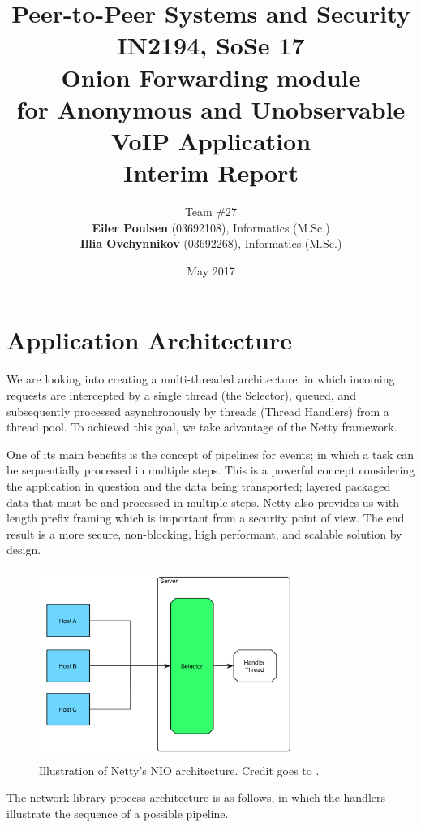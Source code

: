 \documentclass{article}
\title{Peer-to-Peer Systems and Security \\
        \large{IN2194, SoSe 17} \\
        \huge{Onion Forwarding module} \\
        \small{for Anonymous and Unobservable VoIP Application} \\
        \bigbreak
        \large{\textbf{Interim Report}}}
\author{Team \#27 \\
\textbf{Eiler Poulsen} (03692108), Informatics (M.Sc.) \\
\textbf{Illia Ovchynnikov} (03692268), Informatics (M.Sc.)}
\date{May 2017}
\begin{document}
\maketitle

\section{Application Architecture}
We are looking into creating a multi-threaded architecture, in which incoming requests are intercepted by a single thread (the Selector), queued, and subsequently processed asynchronously by threads (Thread Handlers) from a thread pool. To achieved this goal, we take advantage of the Netty framework\cite{netty}.

One of its main benefits is the concept of pipelines for events; in which a task can be sequentially processed in multiple steps. This is a powerful concept considering the application in question and the data being transported; layered packaged data that must be and processed in multiple steps. Netty also provides us with length prefix framing which is important from a security point of view. The end result is a more secure, non-blocking, high performant, and scalable solution by design.

\begin{figure}[H]
\centering
     \includegraphics[width=0.75\textwidth]{arc_img1.png}
      \caption{Illustration of Netty's NIO architecture. Credit goes to \cite{netty}.}
\end{figure}

The network library process architecture is as follows, in which the handlers illustrate the sequence of a possible pipeline.
\end{document}
